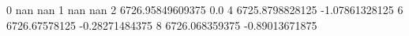 0 nan nan
1 nan nan
2 6726.95849609375 0.0
4 6725.8798828125 -1.07861328125
6 6726.67578125 -0.28271484375
8 6726.068359375 -0.89013671875
